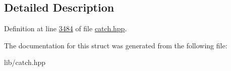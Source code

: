 \subsection{Detailed Description}


Definition at line \mbox{\hyperlink{catch_8hpp_source_l03484}{3484}} of file \mbox{\hyperlink{catch_8hpp_source}{catch.\+hpp}}.



The documentation for this struct was generated from the following file\+:\begin{DoxyCompactItemize}
\item 
lib/catch.\+hpp\end{DoxyCompactItemize}
